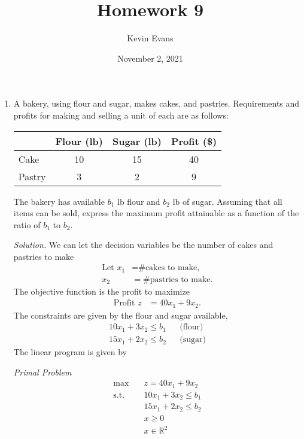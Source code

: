 \documentclass{homework}
\title{Homework 9}
\author{Kevin Evans}
\date{November 2, 2021}
\newcommand{\st}{\mathrm{s.t.}}
\newcommand{\solution}{	\vspace{1em} \textit{Solution.} \quad }
\newcommand{\bolditem}[1][YYY]{\item[\textbf{#1}]}
\begin{document}
	\maketitle
	\begin{enumerate}
		\bolditem[5.1.8] A bakery, using flour and sugar, makes cakes, and pastries. Requirements and profits for making and selling a unit of each are as follows: \begin{center}
				\begin{tabular}{lccc}
					\toprule
					& Flour (lb) & Sugar (lb) & Profit (\$) \\
					\midrule
					Cake & 10 & 15 & 40 \\
					Pastry & 3 & 2 & 9 \\
					\bottomrule
				\end{tabular}
			\end{center}
			The bakery has available $b_1$ lb flour and $b_2$ lb of sugar. Assuming that all items can be sold, express the maximum profit attainable as a function of the ratio of $b_1$ to $b_2$.
			
			\solution We can let the decision variables be the number of cakes and pastries to make \begin{align*}
				\text{Let } x_1 & = \text{\# cakes to make,} \\
					x_2 & = \text{\# pastries to make}.
			\end{align*}
			The objective function is the profit to maximize \begin{align*}
				\text{Profit } z & = 40 x_1 + 9 x_2.
			\end{align*}
			The constraints are given by the flour and sugar available, \begin{align*}
				10 x_1 + 3 x_2 \le b_1 && \text{(flour)} \\
				15 x_1 + 2 x_2 \le b_2 && \text{(sugar)}
			\end{align*}
			The linear program is given by \begin{tcolorbox}
				\textit{Primal Problem} \begin{align*}
					\max \quad & z = 40 x_1 + 9 x_2 \\
					\st \quad & 10 x_1 + 3 x_2 \le b_1 \\
							&	15 x_1 + 2 x_2 \le b_2 \\
							& x \ge 0 \\
							& x \in \mathbb{R}^2
				\end{align*}
			\end{tcolorbox}
		

\end{enumerate}
\end{document}

